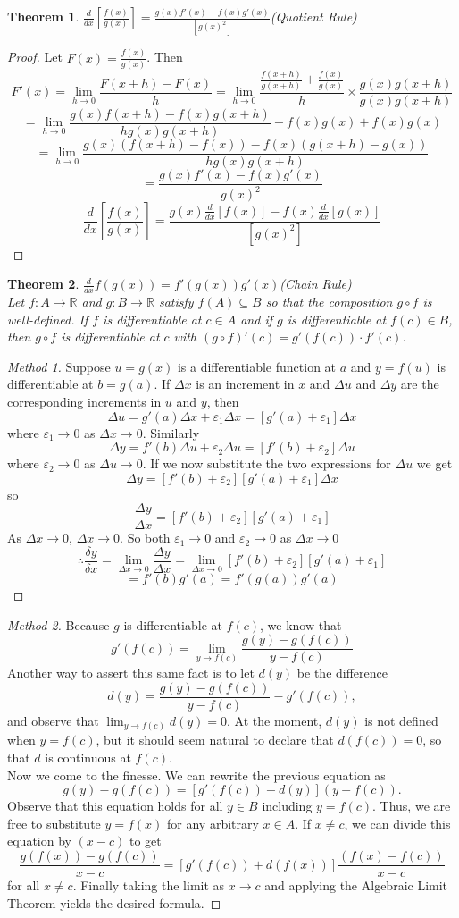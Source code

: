 \documentclass[10pt]{report}
\newtheorem{thm3}{Theorem}[subsection]
\newcommand{\eps}{\varepsilon}
\begin{document}
\begin{thm3}
$\frac{d}{dx}\left[ \frac{f(x)}{g(x)} \right]=\frac{g(x)f'(x)-f(x)g'(x)}{\left[g(x)^2 \right]}$(Quotient Rule)
\end{thm3}
\begin{proof}
Let $F(x)=\frac{f(x)}{g(x)}$. Then
$$F'(x)=\lim_{h\to 0} \frac{F(x+h)-F(x)}{h}=\lim_{h\to 0} \frac{\frac{f(x+h)}{g(x+h)}+\frac{f(x)}{g(x)}}{h}\times \frac{g(x)g(x+h)}{g(x)g(x+h)}$$
$$=\lim_{h\to 0}\frac{g(x)f(x+h)-f(x)g(x+h)}{hg(x)g(x+h)}-f(x)g(x)+f(x)g(x)$$
$$=\lim_{h\to 0}\frac{g(x)(f(x+h)-f(x))-f(x)(g(x+h)-g(x))}{hg(x)g(x+h)}$$
$$=\frac{g(x)f'(x)-f(x)g'(x)}{g(x)^2}$$
$$\frac{d}{dx}\left[ \frac{f(x)}{g(x)} \right]=\frac{g(x)\frac{d}{dx}[f(x)]-f(x)\frac{d}{dx}[g(x)]}{\left[g(x)^2 \right]}$$
\end{proof}
\begin{thm3}
$\frac{d}{dx}f(g(x))=f'(g(x))g'(x)$(Chain Rule)\\
Let $f:A\to\mathbb{R}$ and $g:B\to\mathbb{R}$ satisfy $f(A)\subseteq B$ so that the composition $g\circ f$ is well-defined. If $f$ is differentiable at $c\in A$ and if $g$ is differentiable at $f(c)\in B$, then $g\circ f$ is differentiable at $c$ with $(g\circ f)'(c) = g'(f(c))\cdot f'(c)$.
\end{thm3}
\begin{proof}[Method 1]
Suppose $u=g(x)$ is a differentiable function at $a$ and $y=f(u)$ is differentiable at $b=g(a)$. If $\Delta x$ is an increment in $x$ and $\Delta u$ and $\Delta y$ are the corresponding increments in $u$ and $y$, then
$$\Delta u=g'(a)\Delta x +\eps_1\Delta x=[g'(a) +\eps_1]\Delta x$$
where $\eps_1\to 0$ as $\Delta x\to 0$. Similarly
$$\Delta y=f'(b)\Delta u +\eps_2\Delta u=[f'(b)+\eps_2]\Delta u$$
where $\eps_2\to 0$ as $\Delta u\to 0$. If we now substitute the two expressions for $\Delta u$ we get
$$\Delta y=[f'(b)+\eps_2][g'(a)+\eps_1]\Delta x$$
so
$$\frac{\Delta y}{\Delta x} = [f'(b)+\eps_2][g'(a)+\eps_1]$$
As $\Delta x\to 0$, $\Delta x\to 0$. So both $\eps_1\to 0$ and $\eps_2\to 0$ as $\Delta x\to 0$
$$\therefore\frac{\delta y}{\delta x}=\lim_{\Delta x\to 0}\frac{\Delta y}{\Delta x}=\lim_{\Delta x\to 0}[f'(b)+\eps_2][g'(a)+\eps_1]$$
$$=f'(b)g'(a)=f'(g(a))g'(a)$$
\end{proof}
\begin{proof}[Method 2]
Because $g$ is differentiable at $f(c)$, we know that
$$g'(f(c)) = \lim_{y\to f(c)}\frac{g(y) - g(f(c))}{y-f(c)}$$
Another way to assert this same fact is to let $d(y)$ be the difference
$$d(y) = \frac{g(y)-g(f(c))}{y-f(c)} - g'(f(c)),$$
and observe that $\lim_{y\to f(c)}d(y) = 0$. At the moment, $d(y)$ is not defined when $y=f(c)$, but it should seem natural to declare that $d(f(c))=0$, so that $d$ is continuous at $f(c)$.\\
Now we come to the finesse. We can rewrite the previous equation as
$$g(y)-g(f(c)) = [g'(f(c))+d(y)](y-f(c)).$$
Observe that this equation holds for all $y\in B$ including $y=f(c)$. Thus, we are free to substitute $y=f(x)$ for any arbitrary $x\in A$. If $x\neq c$, we can divide this equation by $(x-c)$ to get
$$\frac{g(f(x))-g(f(c))}{x-c} = [g'(f(c))+d(f(x))]\frac{(f(x)-f(c))}{x-c}$$
for all $x\neq c$. Finally taking the limit as $x\to c$ and applying the Algebraic Limit Theorem yields the desired formula.
\end{proof}
\end{document}
